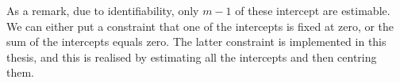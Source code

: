 As a remark, due to identifiability, only $m-1$ of these intercept are estimable.
We can either put a constraint that one of the intercepts is fixed at zero, or the sum of the intercepts equals zero.
The latter constraint is implemented in this thesis, and this is realised by estimating all the intercepts and then centring them.

